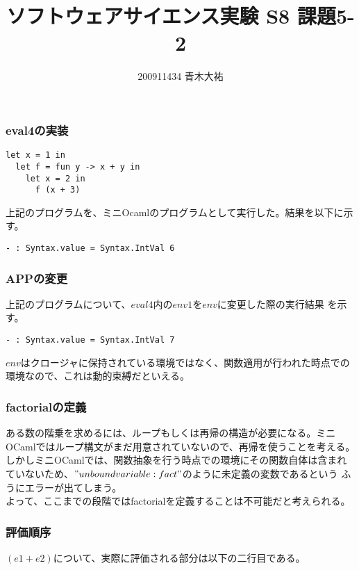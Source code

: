 \documentclass[a4paper,9pt]{jarticle}
\title{ソフトウェアサイエンス実験 S8 課題5-2}
\author{200911434 青木大祐}
\begin{document}
\maketitle
\setcounter{section}{5}
\setcounter{subsection}{2}

\newpage
\subsubsection{eval4の実装}
\begin{lstlisting}
let x = 1 in
  let f = fun y -> x + y in
    let x = 2 in
      f (x + 3)
\end{lstlisting}
上記のプログラムを、ミニOcamlのプログラムとして実行した。結果を以下に示
す。

\begin{lstlisting}
- : Syntax.value = Syntax.IntVal 6
\end{lstlisting}

\subsubsection{APPの変更}
上記のプログラムについて、$eval4$内の$env1$を$env$に変更した際の実行結果
を示す。

\begin{lstlisting}
- : Syntax.value = Syntax.IntVal 7
\end{lstlisting}

$env$はクロージャに保持されている環境ではなく、関数適用が行われた時点での
環境なので、これは動的束縛だといえる。

\subsubsection{factorialの定義}
ある数の階乗を求めるには、ループもしくは再帰の構造が必要になる。ミニ
OCamlではループ構文がまだ用意されていないので、再帰を使うことを考える。
\\
しかしミニOCamlでは、関数抽象を行う時点での環境にその関数自体は含まれ
ていないため、$"unbound variable: fact"$のように未定義の変数であるという
ふうにエラーが出てしまう。\\
よって、ここまでの段階ではfactorialを定義することは不可能だと考えられる。

\subsubsection{評価順序}
$(e1+e2)$について、実際に評価される部分は以下の二行目である。
\end{document}
